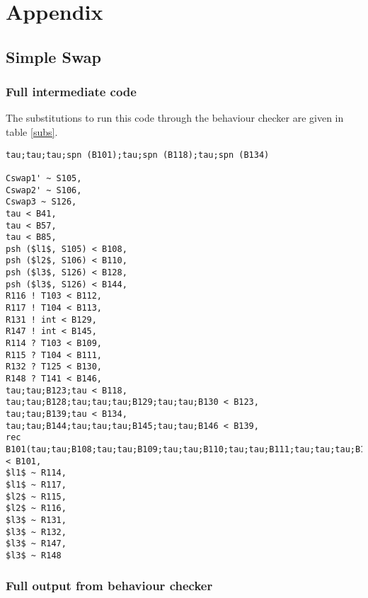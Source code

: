 \chapter*{Appendix}

\section*{Simple Swap}

\subsection*{Full intermediate code}

The substitutions to run this code through the behaviour checker are given in table \ref{subs}. 

\begin{lstlisting} 
tau;tau;tau;spn (B101);tau;spn (B118);tau;spn (B134)

Cswap1' ~ S105,
Cswap2' ~ S106,
Cswap3 ~ S126,
tau < B41,
tau < B57,
tau < B85,
psh ($l1$, S105) < B108,
psh ($l2$, S106) < B110,
psh ($l3$, S126) < B128,
psh ($l3$, S126) < B144,
R116 ! T103 < B112,
R117 ! T104 < B113,
R131 ! int < B129,
R147 ! int < B145,
R114 ? T103 < B109,
R115 ? T104 < B111,
R132 ? T125 < B130,
R148 ? T141 < B146,
tau;tau;B123;tau < B118,
tau;tau;B128;tau;tau;tau;B129;tau;tau;B130 < B123,
tau;tau;B139;tau < B134,
tau;tau;B144;tau;tau;tau;B145;tau;tau;B146 < B139,
rec B101(tau;tau;B108;tau;tau;B109;tau;tau;B110;tau;tau;B111;tau;tau;tau;B112;tau;tau;tau;B113;tau;tau;B101) < B101,
$l1$ ~ R114,
$l1$ ~ R117,
$l2$ ~ R115,
$l2$ ~ R116,
$l3$ ~ R131,
$l3$ ~ R132,
$l3$ ~ R147,
$l3$ ~ R148
\end{lstlisting}

\subsection*{Full output from behaviour checker}

